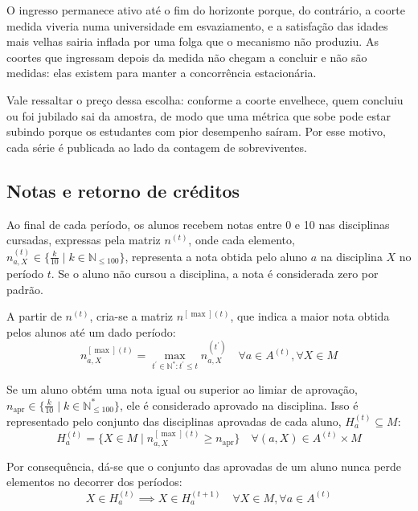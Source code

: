 \documentclass[
    12pt,
    openany,
    oneside,
    a4paper,
    english,
    brazil
]{abntex2}
\begin{document}
O ingresso permanece ativo até o fim do horizonte porque, do contrário, a coorte medida viveria numa universidade em esvaziamento, e a satisfação das idades mais velhas sairia inflada por uma folga que o mecanismo não produziu. As coortes que ingressam depois da medida não chegam a concluir e não são medidas: elas existem para manter a concorrência estacionária.

Vale ressaltar o preço dessa escolha: conforme a coorte envelhece, quem concluiu ou foi jubilado sai da amostra, de modo que uma métrica que sobe pode estar subindo porque os estudantes com pior desempenho saíram. Por esse motivo, cada série é publicada ao lado da contagem de sobreviventes.

\subsection{Notas e retorno de créditos}

Ao final de cada período, os alunos recebem notas entre 0 e 10 nas disciplinas cursadas, expressas pela matriz $n^{(t)}$, onde cada elemento, $n_{a, X}^{(t)} \in \{\frac{k}{10} \mid k \in \mathbb{N}_{\leq100}\}$, representa a nota obtida pelo aluno $a$ na disciplina $X$ no período $t$. Se o aluno não cursou a disciplina, a nota é considerada zero por padrão. 

A partir de $n^{(t)}$, cria-se a matriz $n^{[\max](t)}$, que indica a maior nota obtida pelos alunos até um dado período:
\begin{equation}
    n_{a, X}^{[\max](t)} = \max_{t^\prime \in \mathbb{N^*} : t^\prime \leq t} n_{a, X}^{(t^\prime)}
    \quad \forall a \in A^{(t)}, \forall X \in M
\end{equation}

Se um aluno obtém uma nota igual ou superior ao limiar de aprovação, $n_\text{apr} \in \{\frac{k}{10} \mid k \in \mathbb{N}^*_{\leq100}\}$, ele é considerado aprovado na disciplina. Isso é representado pelo conjunto das disciplinas aprovadas de cada aluno, $H^{(t)}_a \subseteq M$:
\begin{equation}
    H^{(t)}_a = \{X \in M \mid n^{[\max](t)}_{a, X} \geq n_\text{apr} \}
    \quad
    \forall (a, X) \in A^{(t)} \times M
\end{equation}

Por consequência, dá-se que o conjunto das aprovadas de um aluno nunca perde elementos no decorrer dos períodos:
\begin{equation}
    X \in H^{(t)}_a \implies X \in H^{(t + 1)}_a 
    \quad \forall X \in M, \forall a \in A^{(t)}
\end{equation}
\end{document}
